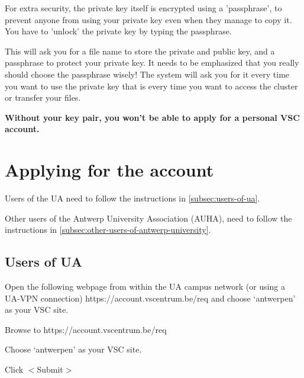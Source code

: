   For extra security, the private key itself is encrypted using a 'passphrase',
  to prevent anyone from using your private key even when they manage to copy
  it. You have to 'unlock' the private key by typing the passphrase.


  This will ask you for a file name to store the private and public key, and a
  passphrase to protect your private key. It needs to be emphasized that you
  really should choose the passphrase wisely! The system will ask you for it
  every time you want to use the private key that is every time you want to
  access the cluster or transfer your files.

  \textbf{Without your key pair, you won't be able to apply for a personal VSC account.}

\fi

\section{Applying for the account}
\label{sec:applying-for-the-account}

Users of the UA need to follow the instructions in \autoref{subsec:users-of-ua}.

Other users of the Antwerp University Association (AUHA), need to follow the
instructions in \autoref{subsec:other-users-of-antwerp-university}.

\subsection{Users of UA}
\label{subsec:users-of-ua}

Open the following webpage from within the UA campus network (or using a UA-VPN
connection) https://account.vscentrum.be/req and choose `antwerpen' as your VSC
site.

Browse to https://account.vscentrum.be/req

Choose `antwerpen' as your VSC site.

Click $<$Submit$>$

